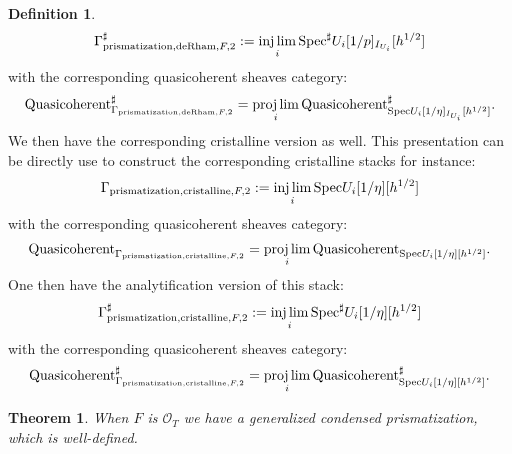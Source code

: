 \documentclass[12pt]{article}
\newtheorem{theorem}{Theorem}
\theoremstyle{definition}
\newtheorem{definition}{Definition}
\begin{document}
\begin{definition}
\begin{align}
\mathrm{\Gamma}^\sharp_{\mathrm{prismatization},\mathrm{deRham},F,2}:=\injlim_i \mathrm{Spec}^\sharp U_i[1/p]_{I_{U_i}}[h^{1/2}]
\end{align}
with the corresponding quasicoherent sheaves category:
\begin{align}
\mathrm{Quasicoherent}^\sharp_{\mathrm{\Gamma}_{\mathrm{prismatization},\mathrm{deRham},F,2}}=\projlim_i \mathrm{Quasicoherent}^\sharp_{\mathrm{Spec}U_i[1/\eta]_{I_{U_i}}[h^{1/2}]}.
\end{align}
We then have the corresponding cristalline version as well. This presentation can be directly use to construct the corresponding cristalline stacks for instance:
\begin{align}
\mathrm{\Gamma}_{\mathrm{prismatization},\mathrm{cristalline},F,2}:=\injlim_i \mathrm{Spec}U_i[1/\eta][h^{1/2}]
\end{align}
with the corresponding quasicoherent sheaves category:
\begin{align}
\mathrm{Quasicoherent}_{\mathrm{\Gamma}_{\mathrm{prismatization},\mathrm{cristalline},F,2}}=\projlim_i \mathrm{Quasicoherent}_{\mathrm{Spec}U_i[1/\eta][h^{1/2}]}.
\end{align}
One then have the analytification version of this stack:
\begin{align}
\mathrm{\Gamma}^\sharp_{\mathrm{prismatization},\mathrm{cristalline},F,2}:=\injlim_i \mathrm{Spec}^\sharp U_i[1/\eta][h^{1/2}]
\end{align}
with the corresponding quasicoherent sheaves category:
\begin{align}
\mathrm{Quasicoherent}^\sharp_{\mathrm{\Gamma}_{\mathrm{prismatization},\mathrm{cristalline},F,2}}=\projlim_i \mathrm{Quasicoherent}^\sharp_{\mathrm{Spec}U_i[1/\eta][h^{1/2}]}.
\end{align} 
\end{definition}


\begin{theorem}
When $F$ is $\mathcal{O}_T$ we have a generalized condensed prismatization, which is well-defined.
\end{theorem}
\end{document}

